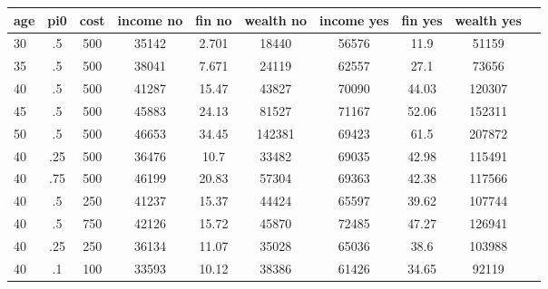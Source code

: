 \begin{table}[htbp]
\begin{tabular}{lccccccccc} \hline \hline
 \multicolumn{1}{c}{ age }  & pi0  & cost  & income no  & fin no  & wealth no  & income yes  & fin yes  & wealth yes  \\  \hline 
       30 &        .5 &       500 &     35142 &     2.701 &     18440 &     56576 &      11.9 &     51159 \\  
       35 &        .5 &       500 &     38041 &     7.671 &     24119 &     62557 &      27.1 &     73656 \\  
       40 &        .5 &       500 &     41287 &     15.47 &     43827 &     70090 &     44.03 &    120307 \\  
       45 &        .5 &       500 &     45883 &     24.13 &     81527 &     71167 &     52.06 &    152311 \\  
       50 &        .5 &       500 &     46653 &     34.45 &    142381 &     69423 &      61.5 &    207872 \\  
       40 &       .25 &       500 &     36476 &      10.7 &     33482 &     69035 &     42.98 &    115491 \\  
       40 &       .75 &       500 &     46199 &     20.83 &     57304 &     69363 &     42.38 &    117566 \\  
       40 &        .5 &       250 &     41237 &     15.37 &     44424 &     65597 &     39.62 &    107744 \\  
       40 &        .5 &       750 &     42126 &     15.72 &     45870 &     72485 &     47.27 &    126941 \\  
       40 &       .25 &       250 &     36134 &     11.07 &     35028 &     65036 &      38.6 &    103988 \\  
       40 &        .1 &       100 &     33593 &     10.12 &     38386 &     61426 &     34.65 &     92119 \\  
\hline \hline \end{tabular}
\end{table}
